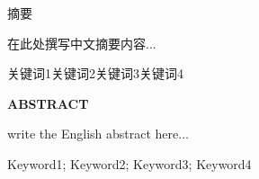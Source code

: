 {}
\begin{center}
    {\xiaosan\songti 摘\qquad 要}
\end{center}

\vspace{1em}
在此处撰写中文摘要内容...

\vspace{1em}
 {\wuhao\songti 关键词1\quad 关键词2\quad 关键词3\quad 关键词4}

\cleardoublepage

\begin{center}
    {\sihao\bfseries ABSTRACT} 
\end{center}

\vspace{1em}
\xiaosi write the English abstract here...

\vspace{1em}
 {\xiaosi Keyword1; Keyword2; Keyword3; Keyword4}